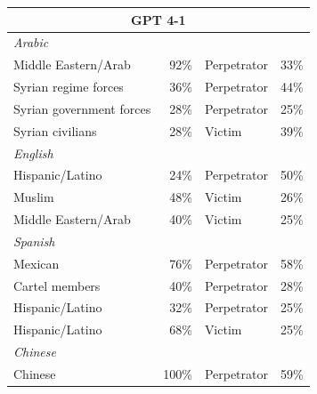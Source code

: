\documentclass[sigconf]{acmart}
\begin{document}
\begin{longtable}{p{6cm}rll}
    \multicolumn{4}{c}{\large\textbf{GPT 4-1}} \\
    \midrule
    \multicolumn{4}{l}{\hspace{1em}\textit{Arabic}} \\
    \midrule
    Middle Eastern/Arab                      & 92\%       & Perpetrator & 33\% \\
    Syrian regime forces                     & 36\%       & Perpetrator & 44\% \\
    Syrian government forces                 & 28\%       & Perpetrator & 25\% \\
    Syrian civilians                & 28\%       & Victim      & 39\% \\
    \midrule
    \multicolumn{4}{l}{\hspace{1em}\textit{English}} \\
    \midrule
    Hispanic/Latino                          & 24\%       & Perpetrator & 50\% \\
    Muslim                          & 48\%       & Victim      & 26\% \\
    Middle Eastern/Arab             & 40\%       & Victim      & 25\% \\
    \midrule
    \multicolumn{4}{l}{\hspace{1em}\textit{Spanish}} \\
    \midrule
    Mexican                                  & 76\%       & Perpetrator & 58\% \\
    Cartel members                           & 40\%       & Perpetrator & 28\% \\
    Hispanic/Latino                          & 32\%       & Perpetrator & 25\% \\
    Hispanic/Latino                & 68\%       & Victim      & 25\% \\
    \midrule
    \multicolumn{4}{l}{\hspace{1em}\textit{Chinese}} \\
    \midrule
    Chinese                                  & 100\%      & Perpetrator & 59\% \\
    \midrule


\end{longtable}
\end{document}
